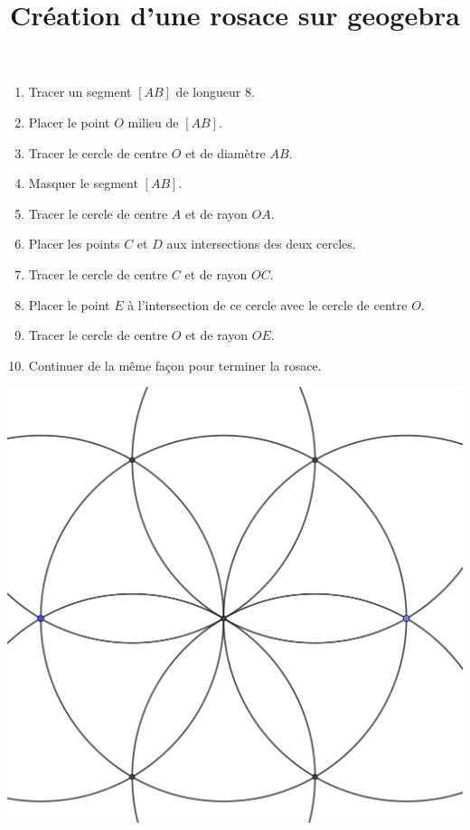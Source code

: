 \documentclass[french, 14pt]{extarticle}
\title{Création d'une rosace sur geogebra}
\date{}
\begin{document}
\maketitle

\vspace*{-2cm}

\begin{enumerate}[label=\arabic*)]
	\item Tracer un segment $[AB]$  de longueur 8.
	\item Placer le point $O$ milieu de $[AB]$.
	\item Tracer le cercle de centre $O$ et de diamètre $AB$.
	\item Masquer le segment $[AB]$.
	\item Tracer le cercle de centre $A$ et de rayon $OA$.
	\item Placer les points $C$ et $D$ aux intersections des deux cercles.
	\item Tracer le cercle de centre $C$ et de rayon $OC$.
	\item Placer le point $E$ à l'intersection de ce cercle avec le cercle de centre $O$. 
	\item Tracer le cercle de centre $O$ et de rayon $OE$.
	\item Continuer de la même façon pour terminer la rosace.
	
	
\end{enumerate}


\begin{center}
	\includegraphics[scale=0.2]{rosace1}
\end{center}
\end{document}
